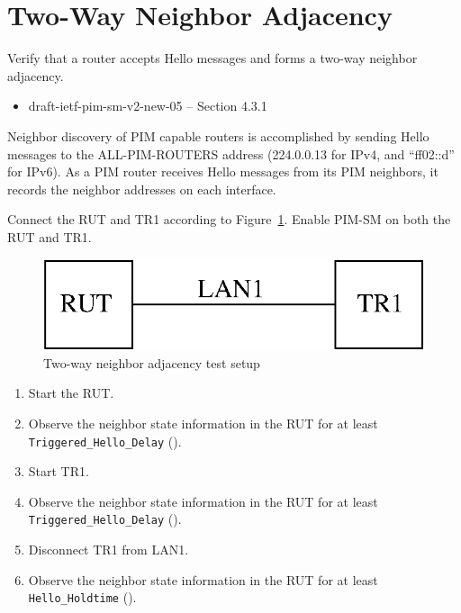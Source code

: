 \documentclass[11pt]{report}
\begin{document}
\newpage
\section{Two-Way Neighbor Adjacency}

Verify that a router accepts Hello messages and forms a two-way neighbor
adjacency.

\begin{itemize}
  \item draft-ietf-pim-sm-v2-new-05 -- Section 4.3.1
\end{itemize}

Neighbor discovery of PIM capable routers is accomplished by sending Hello
messages to the ALL-PIM-ROUTERS address (224.0.0.13 for IPv4,
and ``ff02::d'' for IPv6). As a PIM router receives Hello messages from its
PIM neighbors, it records the neighbor addresses on each interface.

Connect the RUT and TR1 according to
Figure~\ref{fig:pim_test_2_2_two_way_neighbor_adjacency}.
Enable PIM-SM on both the RUT and TR1.

\begin{figure}[htbp]
  \begin{center}
    \includegraphics[scale=0.8]{figs/pim_test_2_2_two_way_neighbor_adjacency}
    \caption{Two-way neighbor adjacency test setup}
    \label{fig:pim_test_2_2_two_way_neighbor_adjacency}
  \end{center}
\end{figure}



\begin{enumerate}

  \item Start the RUT.

  \item Observe the neighbor state information in the RUT for at least
        \verb=Triggered_Hello_Delay= ({\PimsmTriggeredHelloDelay}).

  \item Start TR1.

  \item Observe the neighbor state information in the RUT for at least
        \verb=Triggered_Hello_Delay= ({\PimsmTriggeredHelloDelay}).

  \item Disconnect TR1 from LAN1.

  \item Observe the neighbor state information in the RUT for at least
        \verb=Hello_Holdtime= ({\PimsmHelloHoldtime}).

\end{enumerate}
\end{document}
